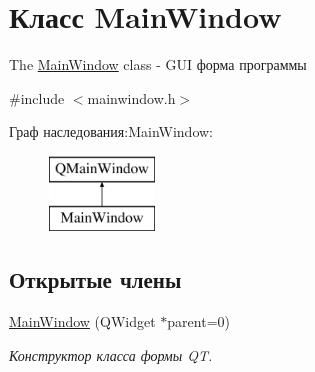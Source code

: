 \hypertarget{class_main_window}{}\section{Класс Main\+Window}
\label{class_main_window}


The \hyperlink{class_main_window}{Main\+Window} class -\/ G\+UI форма программы  




{\ttfamily \#include $<$mainwindow.\+h$>$}

Граф наследования\+:Main\+Window\+:\begin{figure}[H]
\begin{center}
\leavevmode
\includegraphics[height=2.000000cm]{class_main_window}
\end{center}
\end{figure}
\subsection*{Открытые члены}
\begin{DoxyCompactItemize}
\item 
\hypertarget{class_main_window_a8b244be8b7b7db1b08de2a2acb9409db}{}\label{class_main_window_a8b244be8b7b7db1b08de2a2acb9409db} 
\hyperlink{class_main_window_a8b244be8b7b7db1b08de2a2acb9409db}{Main\+Window} (Q\+Widget $\ast$parent=0)
\begin{DoxyCompactList}\small\item\em Конструктор класса формы QT. \end{DoxyCompactList}\end{DoxyCompactItemize}
